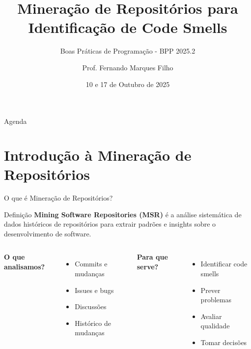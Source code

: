 \documentclass[aspectratio=169,11pt]{beamer}
\title{Mineração de Repositórios para Identificação de Code Smells}
\subtitle{Boas Práticas de Programação - BPP 2025.2}
\author{Prof. Fernando Marques Filho}
\date{10 e 17 de Outubro de 2025}
\institute{Universidade Federal do Rio Grande do Norte}
\begin{document}
\begin{frame}
\titlepage
\end{frame}

\begin{frame}{Agenda}
\tableofcontents
\end{frame}

\section{Introdução à Mineração de Repositórios}

\begin{frame}{O que é Mineração de Repositórios?}
\begin{block}{Definição}
\textbf{Mining Software Repositories (MSR)} é a análise sistemática de dados históricos de repositórios para extrair padrões e insights sobre o desenvolvimento de software.
\end{block}

\begin{columns}[T]
\textbf{O que analisamos?}
\begin{itemize}
    \item {} Commits e mudanças
    \item {} Issues e bugs
    \item {} Discussões
    \item {} Histórico de mudanças
\end{itemize}

\textbf{Para que serve?}
\begin{itemize}
    \item {} Identificar code smells
    \item {} Prever problemas
    \item {} Avaliar qualidade
    \item {} Tomar decisões
\end{itemize}
\end{columns}
\end{frame}
\end{document}
